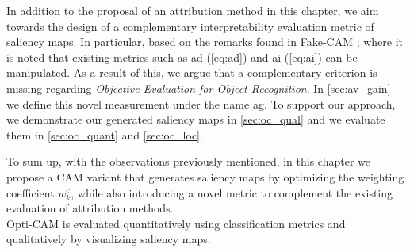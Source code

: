 \noindent In addition to the proposal of an attribution method in this chapter, we aim towards the 
design of a complementary interpretability evaluation metric of saliency maps. In particular, 
based on the remarks found in Fake-CAM \autocite{poppi2021revisiting}; where it is noted that 
existing metrics such as \gls{ad} (\ref{eq:ad}) and \gls{ai} (\ref{eq:ai}) can be manipulated. As a 
result of this, we argue that a complementary criterion is missing regarding \textit{Objective 
Evaluation for Object Recognition}. In \autoref{sec:av_gain} we define this novel measurement 
under the name \gls{ag}. To support our approach, we demonstrate our generated saliency maps in 
\autoref{sec:oc_qual} and we evaluate them in \autoref{sec:oc_quant} and \autoref{sec:oc_loc}.

\noindent To sum up, with the observations previously mentioned, in this chapter we propose a CAM 
variant that generates saliency maps by optimizing the weighting coefficient $w_k^c$, while also 
introducing a novel metric to complement the existing evaluation of attribution methods.\\




Opti-CAM is evaluated quantitatively using classification metrics and qualitatively by visualizing
 saliency maps.

\newpage

\newpage








